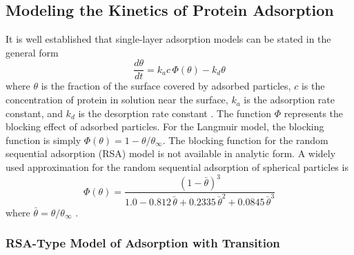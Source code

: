 \subsection{Modeling the Kinetics of Protein Adsorption}

It is well established that single-layer adsorption models can be
stated in the general form\begin{equation}
\frac{d\theta}{dt}=k_{a}c\,\Phi\left(\theta\right)-k_{d}\theta\label{eq:Single Layer Kinetics}\end{equation}
where $\theta$ is the fraction of the surface covered by adsorbed
particles, $c$ is the concentration of protein in solution near the
surface, $k_{a}$ is the adsorption rate constant, and $k_{d}$ is
the desorption rate constant \cite{Andrade1986}. The function $\Phi$
represents the blocking effect of adsorbed particles. For the Langmuir
model, the blocking function is simply $\Phi\left(\theta\right)=1-\theta/\theta_{\infty}$.
The blocking function for the random sequential adsorption (RSA) model
is not available in analytic form. A widely used approximation for
the random sequential adsorption of spherical particles is\begin{equation}
\Phi\left(\theta\right)=\frac{\left(1-\bar{\theta}\right)^{3}}{1.0-0.812\bar{\,\theta}+0.2335\bar{\,\theta}^{2}+0.0845\bar{\,\theta}^{3}}\label{eq:RSA Blocking Function}\end{equation}
where $\bar{\theta}=\theta/\theta_{\infty}$ \cite{Schaaf1989}.


\subsubsection{RSA-Type Model of Adsorption with Transition}

